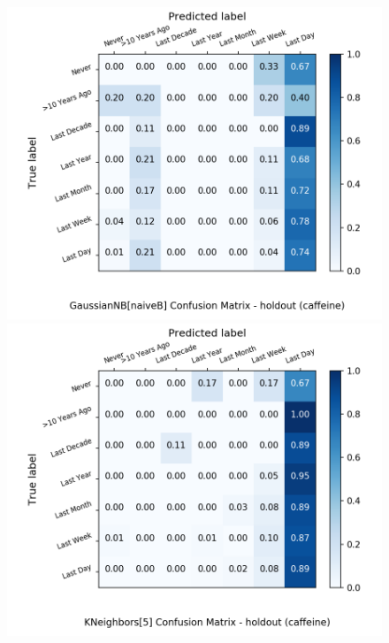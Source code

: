 \begin{figure}[H]
\begin{minipage}[b]{0.32\textwidth}
		\includegraphics[width=1.1\textwidth]{Plots/caffeine_GaussianNB_naiveB_balance_False_holdout.png}
	\end{minipage}
	\begin{minipage}[b]{0.32\textwidth}
		\includegraphics[width=1.1\textwidth]{Plots/caffeine_KNeighbors_5_balance_False_holdout.png}
  \end{minipage}
	\begin{minipage}[b]{0.32\textwidth}

\end{minipage}
\end{figure}
